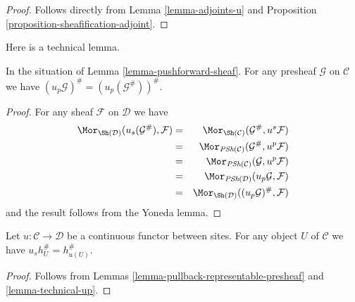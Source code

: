 \begin{proof}
Follows directly from Lemma \ref{lemma-adjoints-u} and
Proposition \ref{proposition-sheafification-adjoint}.
\end{proof}

\noindent
Here is a technical lemma.

\begin{lemma}
\label{lemma-technical-up}
In the situation of Lemma \ref{lemma-pushforward-sheaf}.
For any presheaf $\mathcal{G}$ on $\mathcal{C}$
we have $(u_p\mathcal{G})^\# = (u_p(\mathcal{G}^\#))^\#$.
\end{lemma}

\begin{proof}
For any sheaf $\mathcal{F}$ on $\mathcal{D}$ we have
\begin{eqnarray*}
\Mor_{\Sh(\mathcal{D})}(u_s(\mathcal{G}^\#), \mathcal{F})
& = &
\Mor_{\Sh(\mathcal{C})}(\mathcal{G}^\#, u^s\mathcal{F}) \\
& = &
\Mor_{\textit{PSh}(\mathcal{C})}(\mathcal{G}^\#, u^p\mathcal{F}) \\
& = &
\Mor_{\textit{PSh}(\mathcal{C})}(\mathcal{G}, u^p\mathcal{F}) \\
& = &
\Mor_{\textit{PSh}(\mathcal{D})}(u_p\mathcal{G}, \mathcal{F}) \\
& = &
\Mor_{\Sh(\mathcal{D})}((u_p\mathcal{G})^\#, \mathcal{F})
\end{eqnarray*}
and the result follows from the Yoneda lemma.
\end{proof}

\begin{lemma}
\label{lemma-pullback-representable-sheaf}
Let $u : \mathcal{C} \to \mathcal{D}$ be a continuous functor
between sites.
For any object $U$ of $\mathcal{C}$ we have $u_sh_U^\# = h_{u(U)}^\#$.
\end{lemma}

\begin{proof}
Follows from
Lemmas \ref{lemma-pullback-representable-presheaf}
and \ref{lemma-technical-up}.
\end{proof}


